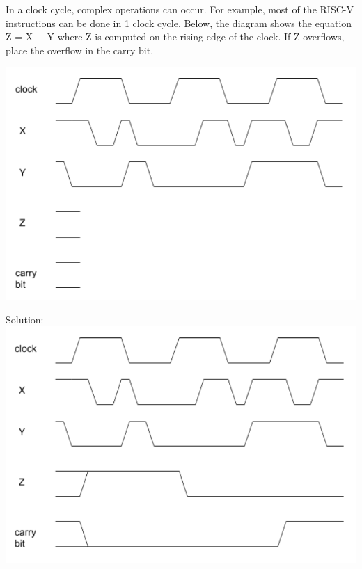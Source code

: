 \begin{blocksection}
\question
In a clock cycle, complex operations can occur.  For example, most of the RISC-V instructions can be done in 1 clock cycle.  Below, the diagram shows the equation Z = X + Y where Z is computed on the rising edge of the clock.  If Z overflows, place the overflow in the carry bit.

\includegraphics[width=\textwidth]{images/sds/basics_b.png}
\begin{solution}
Solution:
\includegraphics[width=\textwidth]{images/sds/basics_b_sol.png}
\end{solution}
\end{blocksection}
